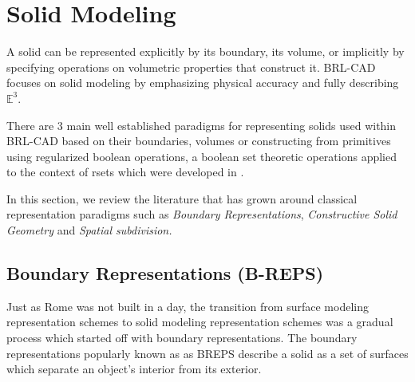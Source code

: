 \clearpage


\section{Solid Modeling}

\hspace{30} A solid can be represented explicitly by its boundary, its volume, or
implicitly by specifying operations on volumetric properties that construct it.
BRL-­CAD focuses on solid modeling by emphasizing physical accuracy and
fully describing $\mathbb{E}^3$.

There are 3 main well­ established paradigms for representing solids used
within BRL-­CAD based on their boundaries, volumes or constructing from
primitives using regularized boolean operations, a boolean set theoretic
operations applied to the context of r­sets which were developed in \cite{4}.

In this section, we review the literature that has grown around classical
representation paradigms such as \textit{Boundary   Representations}, \textit{Constructive  
Solid Geometry} and \textit{Spatial subdivision.}

\subsection{Boundary Representations (B-REPS)}

\hspace{30} Just as Rome was not built in a day, the transition from surface modeling
representation schemes   to   solid   modeling   representation   schemes   was   a  
gradual   process   which   started   off   with   boundary   representations.   The   boundary  
representations   popularly   known   as   as   B­REPS   describe   a   solid   as   a   set   of  
surfaces which separate an object's interior from its exterior. 

